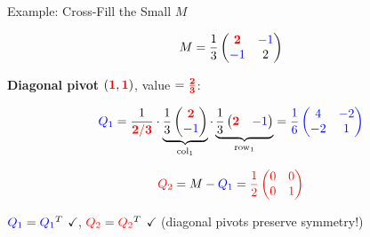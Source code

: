 \documentclass[10pt]{beamer}
\theoremstyle{definition}
\newcommand{\x}[1]{\alert{\textbf{#1}}}
\newcommand{\pvt}[1]{{\color{red}\mathbf{#1}}}       %
\newcommand{\crs}[1]{{\color{blue}#1}}                %
\newcommand{\rd}[1]{{\color{red}#1}}                  %
\newcommand{\bl}[1]{{\color{blue}#1}}                 %
\begin{document}
\begin{frame}{Example: Cross-Fill the Small $M$}

$$M = \frac{1}{3}\begin{pmatrix} \pvt{2} & \crs{-1} \\ \crs{-1} & 2 \end{pmatrix}$$

\x{Diagonal pivot $(\pvt{1},\pvt{1})$}, value $= \pvt{\tfrac{2}{3}}$:

$$\bl{Q_1} = \frac{1}{\pvt{2/3}} \cdot \underbrace{\frac{1}{3}\begin{pmatrix} \pvt{2} \\ \crs{-1} \end{pmatrix}}_{\text{col}_1} \cdot \underbrace{\frac{1}{3}\begin{pmatrix} \pvt{2} & \crs{-1} \end{pmatrix}}_{\text{row}_1} = \bl{\frac{1}{6}\begin{pmatrix} 4 & -2 \\ -2 & 1 \end{pmatrix}}$$

$$\rd{Q_2} = M - \bl{Q_1} = \rd{\frac{1}{2}\begin{pmatrix} 0 & 0 \\ 0 & 1 \end{pmatrix}}$$

$\bl{Q_1} = \bl{Q_1}^T$ $\checkmark$, \; $\rd{Q_2} = \rd{Q_2}^T$ $\checkmark$ \quad (diagonal pivots preserve symmetry!)

\end{frame}
\end{document}
